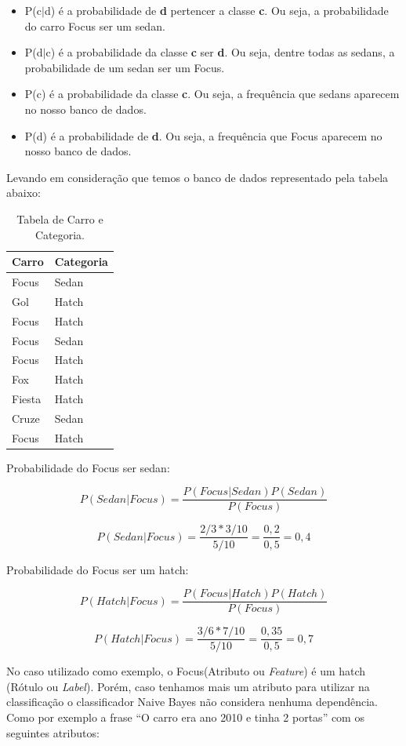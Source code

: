 \begin{itemize}
  \item P(c$\vert$d) é a probabilidade de \textbf{d} pertencer a classe
  \textbf{c}. Ou seja, a probabilidade do carro Focus ser um sedan.
  \item P(d$\vert$c) é a probabilidade da classe \textbf{c} ser \textbf{d}. Ou
  seja, dentre todas as sedans, a probabilidade de um sedan ser
  um Focus.
  \item P(c) é a probabilidade da classe \textbf{c}. Ou seja, a frequência que
  sedans aparecem no nosso banco de dados.
  \item P(d) é a probabilidade de \textbf{d}. Ou seja, a frequência que Focus aparecem no nosso banco de dados.
\end{itemize}

Levando em consideração que temos o banco de dados representado pela tabela
abaixo:

\begin{table}[htb]
\centering
\label{123}
\begin{tabular}{|l|l|}
\hline
Carro  & Categoria \\ \hline
Focus  & Sedan     \\ \hline
Gol    & Hatch     \\ \hline
Focus  & Hatch     \\ \hline
Focus  & Sedan     \\ \hline
Focus  & Hatch     \\ \hline
Fox    & Hatch     \\ \hline
Fiesta & Hatch     \\ \hline
Cruze  & Sedan     \\ \hline
Focus  & Hatch     \\ \hline
\end{tabular} 
\caption{Tabela de Carro e Categoria.}
\end{table}

Probabilidade do Focus ser sedan:

\[ P(Sedan|Focus) = \frac{P(Focus|Sedan) P(Sedan)}{P(Focus)}  \]

\[ P(Sedan|Focus) = \frac{2/3 * 3/10}{5/10} = \frac{0,2}{0,5} = 0,4\]

Probabilidade do Focus ser um hatch:

\[ P(Hatch|Focus) = \frac{P(Focus|Hatch) P(Hatch)}{P(Focus)}  \]

\[ P(Hatch|Focus) = \frac{3/6 * 7/10}{5/10} = \frac{0,35}{0,5} = 0,7\]

No caso utilizado como exemplo, o Focus(Atributo ou \textit{Feature}) é um hatch
(Rótulo ou \textit{Label}).
Porém, caso tenhamos mais um atributo para utilizar na classificação o classificador Naive Bayes não
considera nenhuma dependência.
Como por exemplo a frase ``O carro era ano 2010 e tinha 2 portas'' com os
seguintes atributos:

